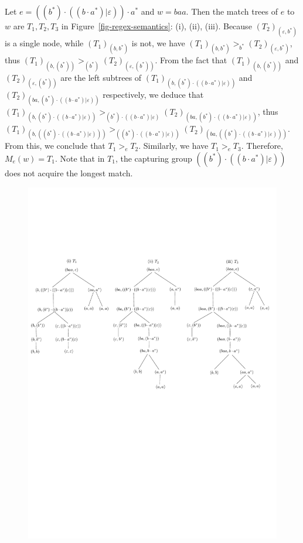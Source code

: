 \begin{example}
Let $e = ((b^\ast) \cdot ((b \cdot a^\ast) | \varepsilon)) \cdot a^\ast$ and $w= baa$. Then the  match trees of $e$ to $w$ are $T_1,T_2,T_3$ in Figure~\ref{fig-regex-semantics}: (i), (ii), (iii).  Because  $(T_2)_{(\varepsilon, b^\ast)}$ is a single node, while $(T_1)_{(b,b^\ast)}$ is not, we have $(T_1)_{(b,b^\ast)} >_{b^\ast} (T_2)_{(\varepsilon, b^\ast)}$, thus $(T_1)_{(b, (b^\ast))} >_{(b^\ast)} (T_2)_{(\varepsilon, (b^\ast))}$. From the fact that $(T_1)_{(b, (b^\ast))}$ and $(T_2)_{(\varepsilon, (b^\ast))}$ are the left subtrees of $(T_1)_{(b, (b^\ast) \cdot ((b\cdot a^\ast) | \varepsilon))}$ and $ (T_2)_{(ba, (b^\ast) \cdot ((b\cdot a^\ast) | \varepsilon))}$ respectively, we deduce that $(T_1)_{(b, (b^\ast) \cdot ((b\cdot a^\ast) | \varepsilon))} >_{(b^\ast) \cdot ((b\cdot a^\ast) | \varepsilon)} (T_2)_{(ba, (b^\ast) \cdot ((b\cdot a^\ast) | \varepsilon))}$, thus $(T_1)_{(b, ((b^\ast) \cdot ((b\cdot a^\ast) | \varepsilon)))} >_{((b^\ast) \cdot ((b\cdot a^\ast) | \varepsilon))} (T_2)_{(ba, ((b^\ast) \cdot ((b\cdot a^\ast) | \varepsilon)))}$. From this, we conclude that $T_1 >_e T_2$. Similarly, we have $T_1 >_e T_3$. Therefore, $M_e(w) = T_1$. 
Note that in $T_1$, the capturing group $((b^\ast) \cdot ((b\cdot a^\ast) | \varepsilon))$ does not acquire the longest match.
\begin{figure}[ht]
\centering
\includegraphics[scale=0.7]{regex-semantics.pdf}

\end{figure}
\end{example}
